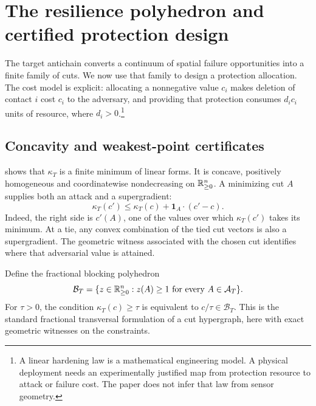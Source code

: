 \section{The resilience polyhedron and certified protection design}
\label{sec:optimization}
The target antichain converts a continuum of spatial failure opportunities into a finite family of cuts. We now use that family to design a protection allocation. The cost model is explicit: allocating a nonnegative value $c_i$ makes deletion of contact $i$ cost $c_i$ to the adversary, and providing that protection consumes $d_i c_i$ units of resource, where $d_i>0$.\footnote{A linear hardening law is a mathematical engineering model. A physical deployment needs an experimentally justified map from protection resource to attack or failure cost. The paper does not infer that law from sensor geometry.}

\subsection{Concavity and weakest-point certificates}
 shows that $\kappa_T$ is a finite minimum of linear forms. It is concave, positively homogeneous and coordinatewise nondecreasing on $\mathbb R_{\ge0}^n$. A minimizing cut $A$ supplies both an attack and a supergradient:
\begin{equation}\label{eq:supergradient}
\kappa_T(c')\le\kappa_T(c)+\boldsymbol1_A\cdot(c'-c).
\end{equation}
Indeed, the right side is $c'(A)$, one of the values over which $\kappa_T(c')$ takes its minimum. At a tie, any convex combination of the tied cut vectors is also a supergradient. The geometric witness associated with the chosen cut identifies where that adversarial value is attained.

Define the fractional blocking polyhedron
\begin{equation}\label{eq:blocking-polyhedron}
\mathcal B_T=\{z\in\mathbb R_{\ge0}^n:z(A)\ge1\text{ for every }A\in\mathcal A_T\}.
\end{equation}
For $\tau>0$, the condition $\kappa_T(c)\ge\tau$ is equivalent to $c/\tau\in\mathcal B_T$. This is the standard fractional transversal formulation of a cut hypergraph, here with exact geometric witnesses on the constraints.

